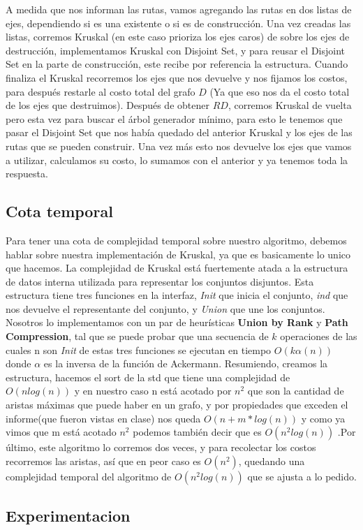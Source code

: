 A medida que nos informan las rutas, vamos agregando las rutas en dos listas de ejes, dependiendo si es una existente o si es de construcción. Una vez creadas las listas, corremos Kruskal (en este caso prioriza los ejes caros) de sobre los ejes de destrucción, implementamos Kruskal con Disjoint Set, y para reusar el Disjoint Set en la parte de construcción, este recibe por referencia la estructura. Cuando finaliza el Kruskal recorremos los ejes que nos devuelve y nos fijamos los costos, para después restarle al costo total del grafo $D$ (Ya que eso nos da el costo total de los ejes que destruimos). Después de obtener $RD$, corremos Kruskal de vuelta pero esta vez para buscar el árbol generador mínimo, para esto le tenemos que pasar el Disjoint Set que nos había quedado del anterior Kruskal  y los ejes de las rutas que se pueden construir. Una vez más esto nos devuelve los ejes que vamos a utilizar, calculamos su costo, lo sumamos con el anterior y ya tenemos toda la respuesta.

\subsection{Cota temporal}

Para tener una cota de complejidad temporal sobre nuestro algoritmo, debemos hablar sobre nuestra implementación de Kruskal, ya que es basicamente lo unico que hacemos.
La complejidad de Kruskal está fuertemente atada a la estructura de datos interna utilizada para representar los conjuntos disjuntos. Esta estructura tiene tres funciones en la interfaz, \textit{Init} que inicia el conjunto, \textit{ind} que nos devuelve el representante del conjunto, y \textit{Union} que une los conjuntos. Nosotros lo implementamos con un par de heurísticas \textbf{Union by Rank} y \textbf{Path Compression}, tal que se puede probar que una secuencia de $k$ operaciones de las cuales n son \textit{Init} de estas tres funciones se ejecutan en tiempo $O(k\alpha (n))$ donde $\alpha$ es la inversa de la función de Ackermann. Resumiendo, creamos la estructura, hacemos el sort de la std que tiene una complejidad de $O(nlog(n))$ y en nuestro caso n está acotado por $n^2$ que son la cantidad de aristas máximas que puede haber en un grafo, y por propiedades que exceden el informe(que fueron vistas en clase) nos queda $O(n + m*log(n))$ y como ya vimos que m está acotado $n^2$ podemos también decir que es $O(n^2log(n))$ .Por último, este algoritmo lo corremos dos veces, y para recolectar los costos recorremos las aristas, así que en peor caso es $O(n^2)$, quedando una complejidad temporal del algoritmo de $O(n^2log(n))$ que se ajusta a lo pedido.

\subsection{Experimentacion}

\pagebreak